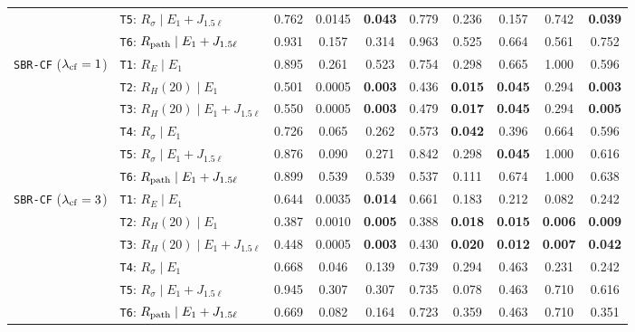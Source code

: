 \documentclass[preprint,11pt,a4paper]{elsarticle}
\begin{document}
\begin{table}[ht!]
{\begin{tabular}{llcccccccc}
 & \texttt{T5}: $R_\sigma\mid E_1+J_{1.5\ell}$ & 0.762 & 0.0145 & \textbf{0.043} & 0.779 & 0.236 & 0.157 & 0.742 & \textbf{0.039} \\
 & \texttt{T6}: $R_{\rm path}\mid E_1+J_{1.5\ell}$ & 0.931 & 0.157 & 0.314 & 0.963 & 0.525 & 0.664 & 0.561 & 0.752 \\
\midrule
\texttt{SBR-CF} ($\lambda_{\rm cf}=1$)
 & \texttt{T1}: $R_E\mid E_1$ & 0.895 & 0.261 & 0.523 & 0.754 & 0.298 & 0.665 & 1.000 & 0.596 \\
 & \texttt{T2}: $R_H(20)\mid E_1$ & 0.501 & 0.0005 & \textbf{0.003} & 0.436 & \textbf{0.015} & \textbf{0.045} & 0.294 & \textbf{0.003} \\
 & \texttt{T3}: $R_H(20)\mid E_1+J_{1.5\ell}$ & 0.550 & 0.0005 & \textbf{0.003} & 0.479 & \textbf{0.017} & \textbf{0.045} & 0.294 & \textbf{0.005} \\
 & \texttt{T4}: $R_\sigma\mid E_1$ & 0.726 & 0.065 & 0.262 & 0.573 & \textbf{0.042} & 0.396 & 0.664 & 0.596 \\
 & \texttt{T5}: $R_\sigma\mid E_1+J_{1.5\ell}$ & 0.876 & 0.090 & 0.271 & 0.842 & 0.298 & \textbf{0.045} & 1.000 & 0.616 \\
 & \texttt{T6}: $R_{\rm path}\mid E_1+J_{1.5\ell}$ & 0.899 & 0.539 & 0.539 & 0.537 & 0.111 & 0.674 & 1.000 & 0.638 \\
\midrule
\texttt{SBR-CF} ($\lambda_{\rm cf}=3$)
 & \texttt{T1}: $R_E\mid E_1$ & 0.644 & 0.0035 & \textbf{0.014} & 0.661 & 0.183 & 0.212 & 0.082 & 0.242 \\
 & \texttt{T2}: $R_H(20)\mid E_1$ & 0.387 & 0.0010 & \textbf{0.005} & 0.388 & \textbf{0.018} & \textbf{0.015} & \textbf{0.006} & \textbf{0.009} \\
 & \texttt{T3}: $R_H(20)\mid E_1+J_{1.5\ell}$ & 0.448 & 0.0005 & \textbf{0.003} & 0.430 & \textbf{0.020} & \textbf{0.012} & \textbf{0.007} & \textbf{0.042} \\
 & \texttt{T4}: $R_\sigma\mid E_1$ & 0.668 & 0.046 & 0.139 & 0.739 & 0.294 & 0.463 & 0.231 & 0.242 \\
 & \texttt{T5}: $R_\sigma\mid E_1+J_{1.5\ell}$ & 0.945 & 0.307 & 0.307 & 0.735 & 0.078 & 0.463 & 0.710 & 0.616 \\
 & \texttt{T6}: $R_{\rm path}\mid E_1+J_{1.5\ell}$ & 0.669 & 0.082 & 0.164 & 0.723 & 0.359 & 0.463 & 0.710 & 0.351 \\
\bottomrule
\end{tabular}%
}
\end{table}
\end{document}
